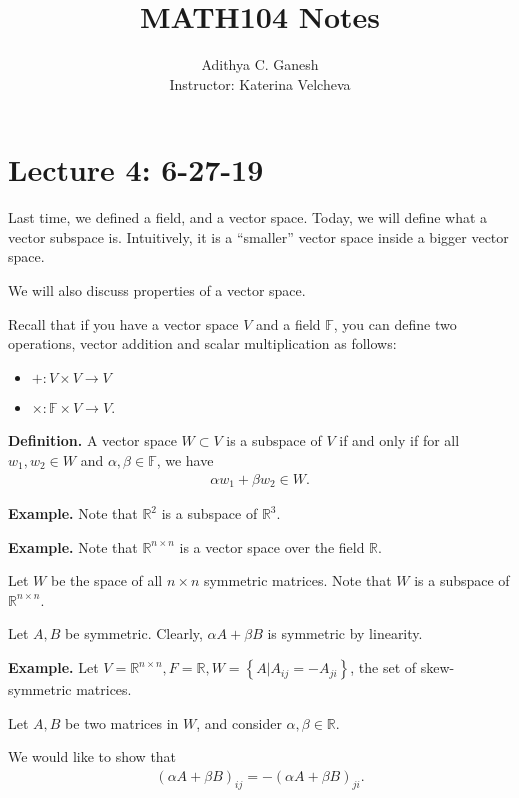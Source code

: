 \documentclass{article}
\title{MATH104 Notes}
\author{Adithya C. Ganesh \\ Instructor: Katerina Velcheva}
\begin{document}
\maketitle

\tableofcontents

\section{Lecture 4: 6-27-19}

Last time, we defined a field, and a vector space.  Today, we will define what a vector subspace is.  Intuitively, it is a ``smaller'' vector space inside a bigger vector space.

We will also discuss properties of a vector space.

Recall that if you have a vector space $V$ and a field $\mathbb{F}$, you can define two operations, vector addition and scalar multiplication as follows:

\begin{itemize}
  \item $+ : V \times V \to V$
  \item $\times: \mathbb{F} \times V \to V$.
\end{itemize}

{\bf Definition.} A vector space $W \subset V$ is a subspace of $V$ if and only if for all $w_1, w_2 \in W$ and $\alpha, \beta \in \mathbb{F}$, we have
\begin{align*}
  \alpha w_1 + \beta w_2 \in W.
\end{align*}

{\bf Example.} Note that $\mathbb{R}^2$ is a subspace of $\mathbb{R}^3$.

{\bf Example.} Note that $\mathbb{R}^{n \times n}$ is a vector space over the field $\mathbb{R}$.

Let $W$ be the space of all $n \times n$ symmetric matrices.  Note that $W$ is a subspace of $\mathbb{R}^{n \times n}$.

Let $A, B$ be symmetric.  Clearly, $\alpha A + \beta B$ is symmetric by linearity.

{\bf Example.} Let $V = \mathbb{R}^{n \times n}, F = \mathbb{R}, W = \left\{ A | A_{ij} = - A_{ji} \right\}$, the set of skew-symmetric matrices.

Let $A, B$ be two matrices in $W$, and consider $\alpha, \beta \in \mathbb{R}$.

We would like to show that
\begin{align*}
  (\alpha A + \beta B)_{ij} = - (\alpha A + \beta B)_{ji}.
\end{align*}
\end{document}
